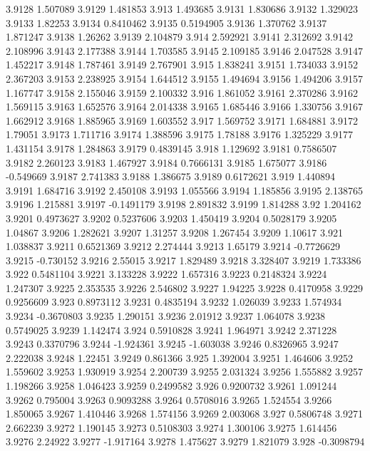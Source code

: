 3.9128  1.507089
3.9129  1.481853
3.913  1.493685
3.9131  1.830686
3.9132  1.329023
3.9133  1.82253
3.9134  0.8410462
3.9135  0.5194905
3.9136  1.370762
3.9137  1.871247
3.9138  1.26262
3.9139  2.104879
3.914  2.592921
3.9141  2.312692
3.9142  2.108996
3.9143  2.177388
3.9144  1.703585
3.9145  2.109185
3.9146  2.047528
3.9147  1.452217
3.9148  1.787461
3.9149  2.767901
3.915  1.838241
3.9151  1.734033
3.9152  2.367203
3.9153  2.238925
3.9154  1.644512
3.9155  1.494694
3.9156  1.494206
3.9157  1.167747
3.9158  2.155046
3.9159  2.100332
3.916  1.861052
3.9161  2.370286
3.9162  1.569115
3.9163  1.652576
3.9164  2.014338
3.9165  1.685446
3.9166  1.330756
3.9167  1.662912
3.9168  1.885965
3.9169  1.603552
3.917  1.569752
3.9171  1.684881
3.9172  1.79051
3.9173  1.711716
3.9174  1.388596
3.9175  1.78188
3.9176  1.325229
3.9177  1.431154
3.9178  1.284863
3.9179  0.4839145
3.918  1.129692
3.9181  0.7586507
3.9182  2.260123
3.9183  1.467927
3.9184  0.7666131
3.9185  1.675077
3.9186  -0.549669
3.9187  2.741383
3.9188  1.386675
3.9189  0.6172621
3.919  1.440894
3.9191  1.684716
3.9192  2.450108
3.9193  1.055566
3.9194  1.185856
3.9195  2.138765
3.9196  1.215881
3.9197  -0.1491179
3.9198  2.891832
3.9199  1.814288
3.92  1.204162
3.9201  0.4973627
3.9202  0.5237606
3.9203  1.450419
3.9204  0.5028179
3.9205  1.04867
3.9206  1.282621
3.9207  1.31257
3.9208  1.267454
3.9209  1.10617
3.921  1.038837
3.9211  0.6521369
3.9212  2.274444
3.9213  1.65179
3.9214  -0.7726629
3.9215  -0.730152
3.9216  2.55015
3.9217  1.829489
3.9218  3.328407
3.9219  1.733386
3.922  0.5481104
3.9221  3.133228
3.9222  1.657316
3.9223  0.2148324
3.9224  1.247307
3.9225  2.353535
3.9226  2.546802
3.9227  1.94225
3.9228  0.4170958
3.9229  0.9256609
3.923  0.8973112
3.9231  0.4835194
3.9232  1.026039
3.9233  1.574934
3.9234  -0.3670803
3.9235  1.290151
3.9236  2.01912
3.9237  1.064078
3.9238  0.5749025
3.9239  1.142474
3.924  0.5910828
3.9241  1.964971
3.9242  2.371228
3.9243  0.3370796
3.9244  -1.924361
3.9245  -1.603038
3.9246  0.8326965
3.9247  2.222038
3.9248  1.22451
3.9249  0.861366
3.925  1.392004
3.9251  1.464606
3.9252  1.559602
3.9253  1.930919
3.9254  2.200739
3.9255  2.031324
3.9256  1.555882
3.9257  1.198266
3.9258  1.046423
3.9259  0.2499582
3.926  0.9200732
3.9261  1.091244
3.9262  0.795004
3.9263  0.9093288
3.9264  0.5708016
3.9265  1.524554
3.9266  1.850065
3.9267  1.410446
3.9268  1.574156
3.9269  2.003068
3.927  0.5806748
3.9271  2.662239
3.9272  1.190145
3.9273  0.5108303
3.9274  1.300106
3.9275  1.614456
3.9276  2.24922
3.9277  -1.917164
3.9278  1.475627
3.9279  1.821079
3.928  -0.3098794
